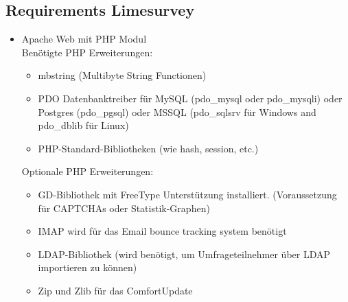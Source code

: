 \subsection{Requirements Limesurvey}
\begin{itemize}
\item Apache Web mit PHP Modul
\\Benötigte PHP Erweiterungen:
\begin{itemize}
\item mbstring (Multibyte String Functionen)
\item PDO Datenbanktreiber für MySQL (pdo\_mysql oder pdo\_mysqli) oder Postgres (pdo\_pgsql) oder MSSQL (pdo\_sqlsrv für Windows and pdo\_dblib für Linux)
\item PHP-Standard-Bibliotheken (wie hash, session, etc.)
\end{itemize}
Optionale PHP Erweiterungen:

\begin{itemize}
\item GD-Bibliothek mit FreeType Unterstützung installiert. (Voraussetzung für CAPTCHAs oder Statistik-Graphen)
\item IMAP wird für das Email bounce tracking system benötigt
\item LDAP-Bibliothek (wird benötigt, um Umfrageteilnehmer über LDAP importieren zu können)
\item Zip und Zlib für das ComfortUpdate
\end{itemize}
\end{itemize}


